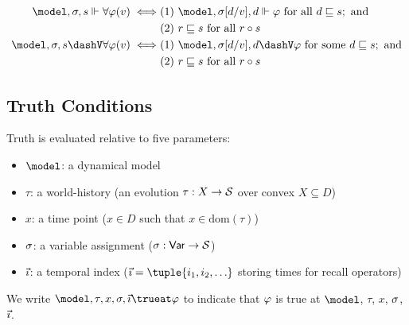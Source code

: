 \documentclass[../LogosReference.tex]{subfiles}
\begin{document}
\begin{definition}\label{def:universal-quantification}
	\begin{align}
    \model, \assignment, s \verifies \forall \metaA(v)   \iff 
      & \text{(1) } \model, \assignsub{d}{v}, d \verifies \metaA \text{ for all } d \parthood s; \text{ and} \notag \\
      & \text{(2) } r \parthood s \text{ for all } r \compatible s \\
    \model, \assignment, s \falsifies \forall \metaA(v)   \iff 
      & \text{(1) } \model, \assignsub{d}{v}, d \falsifies \metaA \text{ for some } d \parthood s; \text{ and} \notag \\
      & \text{(2) } r \parthood s \text{ for all } r \compatible s 
	\end{align}
\end{definition}



\subsection{Truth Conditions}\label{sec:truth-conditions}

Truth is evaluated relative to five parameters:
\begin{itemize}
    \item $\model$: a dynamical model
    \item $\tau$: a world-history (an evolution $\tau : X \to \mathcal{S}$ over convex $X \subseteq D$)
    \item $x$: a time point ($x \in D$ such that $x \in \mathrm{dom}(\tau)$)
    \item $\sigma$: a variable assignment ($\sigma : \mathsf{Var} \to \mathcal{S}$)
    \item $\vec{\imath}$: a temporal index ($\tempindex = \tuple{i_1, i_2, \ldots}$ storing times for recall operators)
\end{itemize}
\noindent
We write $\model, \tau, x, \assignment, \tempindex \trueat \metaA$ to indicate that $\varphi$ is true at $\model$, $\tau$, $x$, $\sigma$, $\vec{\imath}$.
\end{document}
